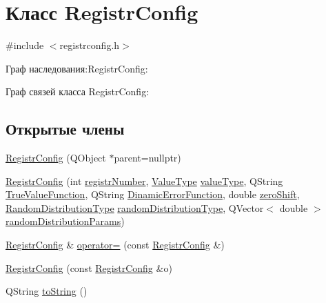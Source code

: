 \hypertarget{class_registr_config}{}\section{Класс Registr\+Config}
\label{class_registr_config}


{\ttfamily \#include $<$registrconfig.\+h$>$}



Граф наследования\+:Registr\+Config\+:


Граф связей класса Registr\+Config\+:
\subsection*{Открытые члены}
\begin{DoxyCompactItemize}
\item 
\hyperlink{class_registr_config_a9b9fed35d14dfed2223389df4ea1d2f8}{Registr\+Config} (Q\+Object $\ast$parent=nullptr)
\item 
\hyperlink{class_registr_config_aa8266801862bcb19391019e5997335b5}{Registr\+Config} (int \hyperlink{class_registr_config_ae10ac0f731bdd42c08d9734113fec523}{registr\+Number}, \hyperlink{_random_types_8h_ad9971b6ef33e02ba2c75d19c1d2518a1}{Value\+Type} \hyperlink{class_registr_config_a225f0855af5ecab5e7c2579a7e949117}{value\+Type}, Q\+String \hyperlink{class_registr_config_aa31a7e72c472f4de4dd94d0ac4ceba5d}{True\+Value\+Function}, Q\+String \hyperlink{class_registr_config_a1729b4f02c0df66d4c9dbd4d96ebe3db}{Dinamic\+Error\+Function}, double \hyperlink{class_registr_config_a1eba0a4fe2119907305a961bd946b851}{zero\+Shift}, \hyperlink{_random_types_8h_ad7b55c73a22b009b1551ea87b0955a60}{Random\+Distribution\+Type} \hyperlink{class_registr_config_a39afaf7c454c0582fdc2f81e9f63b11b}{random\+Distribution\+Type}, Q\+Vector$<$ double $>$ \hyperlink{class_registr_config_a5957b23fb3bbb3c83f0bc0f757e943b4}{random\+Distribution\+Params})
\item 
\hyperlink{class_registr_config}{Registr\+Config} \& \hyperlink{class_registr_config_aaddc106fdff1f741cc560ae115289550}{operator=} (const \hyperlink{class_registr_config}{Registr\+Config} \&)
\item 
\hyperlink{class_registr_config_a72d544ec8d5b56bdbb2024924496e2fe}{Registr\+Config} (const \hyperlink{class_registr_config}{Registr\+Config} \&o)
\item 
Q\+String \hyperlink{class_registr_config_a76cb21bfd561fef06ac3db93d0499c90}{to\+String} ()
\end{DoxyCompactItemize}
